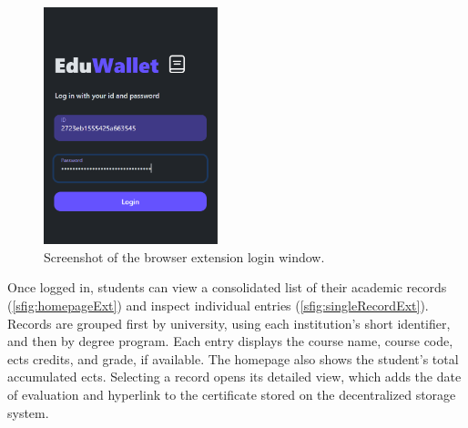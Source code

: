\begin{figure}
  \centering
  \includegraphics[width=0.45\textwidth]{figures/Login.png}
  \caption[Browser extension login page]{Screenshot of the browser extension login window.}
  \label{fig:loginExtDesign}
\end{figure}

Once logged in, students can view a consolidated list of their academic records (\cref{sfig:homepageExt}) and inspect individual entries (\cref{sfig:singleRecordExt}). Records are grouped first by university, using each institution's short identifier, and then by degree program. Each entry displays the course name, course code, \acrshort{ects} credits, and grade, if available. The homepage also shows the student's total accumulated \acrshort{ects}. Selecting a record opens its detailed view, which adds the date of evaluation and hyperlink to the certificate stored on the decentralized storage system. 

